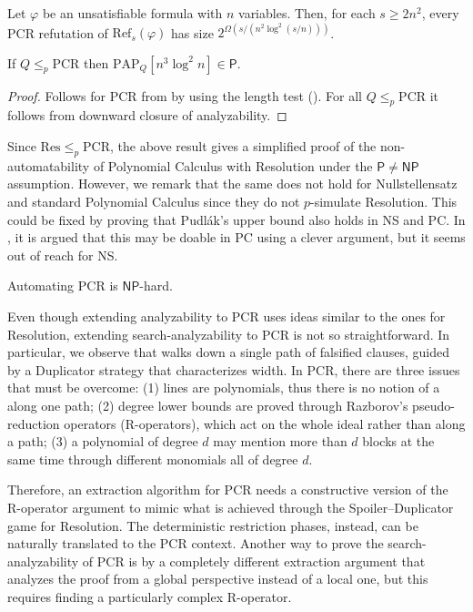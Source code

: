 \begin{corollary}
    \label{cor:pcr_lower_bound}
    Let $\varphi$ be an unsatisfiable formula with $n$ variables. Then, for each $s \geq 2n^2$, every PCR refutation of $\mathrm{Ref}_s(\varphi)$ has size $2^{\Omega(s/(n^2\log^2(s/n)))}$.
\end{corollary}

\begin{theorem}
    \label{thm:pcr_an}
    If $Q \leq_p \mathrm{PCR}$ then $\mathrm{PAP}_{Q}[n^3 \log^2 n] \in \mathsf{P}$.
\end{theorem}

\begin{proof}
    Follows for PCR from  by using the length test (). For all $Q \leq_p \mathrm{PCR}$ it follows from downward closure of analyzability.
\end{proof}

Since $\mathrm{Res} \leq_p \mathrm{PCR}$, the above result gives a simplified proof of the non-automatability of Polynomial Calculus with Resolution under the $\mathsf{P} \neq \mathsf{NP}$ assumption. However, we remark that the same does not hold for Nullstellensatz and standard Polynomial Calculus since they do not $p$-simulate Resolution. This could be fixed by proving that Pudlák's upper bound also holds in NS and PC. In \cite{alg_nphard}, it is argued that this may be doable in PC using a clever argument, but it seems out of reach for NS.

\begin{corollary}
    Automating PCR is $\mathsf{NP}$-hard.
\end{corollary}

Even though extending analyzability to PCR uses ideas similar to the ones for Resolution, extending search-analyzability to PCR is not so straightforward. In particular, we observe that  walks down a single path of falsified clauses, guided by a Duplicator strategy that characterizes width. In PCR, there are three issues that must be overcome: (1) lines are polynomials, thus there is no notion of a  along one path; (2) degree lower bounds are proved through Razborov's \cite{raz_pc} pseudo-reduction operators (R-operators), which act on the whole ideal rather than along a path; (3) a polynomial of degree $d$ may mention more than $d$ blocks at the same time through different monomials all of degree $d$.

Therefore, an extraction algorithm for PCR needs a constructive version of the R-operator argument to mimic what is achieved through the Spoiler--Duplicator game for Resolution. The deterministic restriction phases, instead, can be naturally translated to the PCR context. Another way to prove the search-analyzability of PCR is by a completely different extraction argument that analyzes the proof from a global perspective instead of a local one, but this requires finding a particularly complex R-operator.

